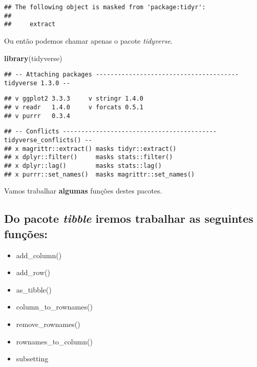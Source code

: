 \documentclass[]{book}
\newenvironment{Shaded}{\begin{snugshade}}{\end{snugshade}}
\newcommand{\KeywordTok}[1]{\textcolor[rgb]{0.13,0.29,0.53}{\textbf{#1}}}
\newcommand{\NormalTok}[1]{#1}
\providecommand{\tightlist}{%
  \setlength{\itemsep}{0pt}\setlength{\parskip}{0pt}}
\begin{document}
\begin{verbatim}
## The following object is masked from 'package:tidyr':
## 
##     extract
\end{verbatim}

Ou então podemos chamar apenas o pacote \emph{tidyverse}.

\begin{Shaded}
\begin{Highlighting}[]
\KeywordTok{library}\NormalTok{(tidyverse)}
\end{Highlighting}
\end{Shaded}

\begin{verbatim}
## -- Attaching packages --------------------------------------- tidyverse 1.3.0 --
\end{verbatim}

\begin{verbatim}
## v ggplot2 3.3.3     v stringr 1.4.0
## v readr   1.4.0     v forcats 0.5.1
## v purrr   0.3.4
\end{verbatim}

\begin{verbatim}
## -- Conflicts ------------------------------------------ tidyverse_conflicts() --
## x magrittr::extract() masks tidyr::extract()
## x dplyr::filter()     masks stats::filter()
## x dplyr::lag()        masks stats::lag()
## x purrr::set_names()  masks magrittr::set_names()
\end{verbatim}

Vamos trabalhar \textbf{algumas} funções destes pacotes.

\hypertarget{do-pacote-tibble-iremos-trabalhar-as-seguintes-funuxe7uxf5es}{%
\subsection{\texorpdfstring{Do pacote \emph{tibble} iremos trabalhar as seguintes funções:}{Do pacote tibble iremos trabalhar as seguintes funções:}}\label{do-pacote-tibble-iremos-trabalhar-as-seguintes-funuxe7uxf5es}}

\begin{itemize}
\tightlist
\item
  add\_column()
\item
  add\_row()
\item
  as\_tibble()
\item
  column\_to\_rownames()
\item
  remove\_rownames()
\item
  rownames\_to\_column()
\item
  subsetting
\end{itemize}
\end{document}
